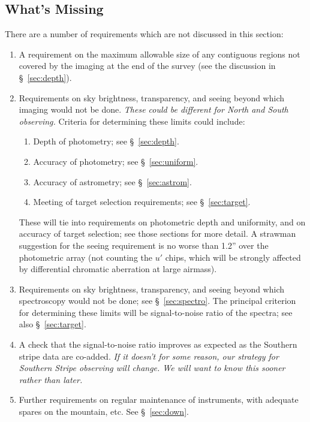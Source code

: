 \subsection{What's Missing}

There are a number of requirements which are not discussed in this
section: 

\begin{enumerate} 
\item A requirement on the maximum allowable size of any contiguous regions not
covered by the imaging at the end of the survey (see the discussion in
\S~\ref{sec:depth}).
\item Requirements on sky brightness, transparency, and seeing beyond
which imaging would not be done.  {\it These could be different for
North and South observing.}  Criteria for determining these limits
could include:
\begin{enumerate} 
\item Depth of photometry; see \S~\ref{sec:depth}.
\item Accuracy of photometry; see \S~\ref{sec:uniform}.
\item Accuracy of astrometry; see \S~\ref{sec:astrom}.
\item Meeting of target selection requirements; see
\S~\ref{sec:target}. 
\end{enumerate}
These will tie into requirements on photometric depth and uniformity,
and on accuracy of target selection; see those sections for more
detail.  A strawman suggestion for the seeing requirement is no worse
than 1.2'' over the photometric array (not counting the $u'$ chips,
which will be strongly affected by differential chromatic aberration
at large airmass). 

\item  Requirements on sky brightness, transparency, and seeing beyond
which spectroscopy would not be done; see \S~\ref{sec:spectro}.  The principal criterion for
determining these limits will be signal-to-noise ratio of the spectra;
see also \S~\ref{sec:target}. 

\item A check that the signal-to-noise ratio improves as expected as
the Southern stripe data are co-added. {\it If it doesn't for some
reason, our strategy for Southern Stripe observing will change.  We
will want to know this sooner rather than later.}

\item Further requirements on regular maintenance of instruments, with
adequate spares on the mountain, etc.  See \S~\ref{sec:down}.


\end{enumerate}
